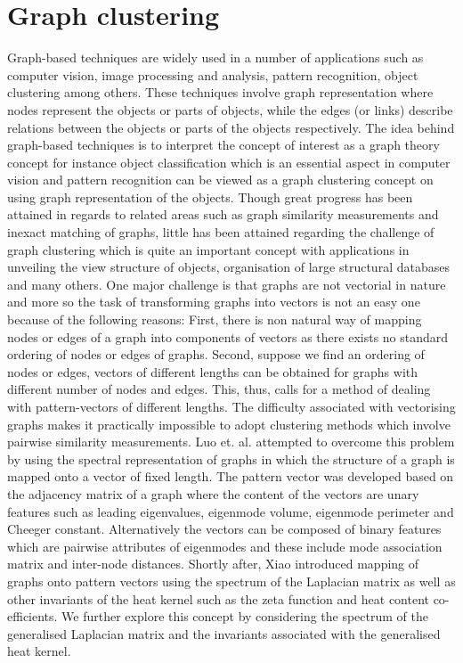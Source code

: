 \documentclass[10pt,a4paper]{article}
\theoremstyle{plain}
\theoremstyle{definition}
\begin{document}
\section{Graph clustering}
Graph-based techniques are widely used in a number of applications such as computer vision,  image processing and analysis, pattern recognition, object clustering among others. These techniques involve graph representation where nodes represent the objects or parts of objects, while the edges (or links) describe relations between the objects or parts of the objects respectively. The idea behind graph-based techniques is to interpret the concept of interest as a graph theory concept for instance object classification which is an essential aspect in computer vision and pattern recognition can be viewed as a graph clustering concept on using graph representation of the objects. Though great progress has been attained in regards to related areas such as graph similarity measurements and inexact matching of graphs, little has been attained regarding the challenge of graph clustering which is quite an important concept with applications in unveiling the view structure of objects, organisation of large structural databases and many others. One major challenge is that graphs are not vectorial in nature and more so the task of transforming graphs into vectors is not an easy one because of the following reasons: First, there is non natural way of mapping nodes or edges of a graph into components of vectors as there exists no standard ordering of nodes or edges of graphs. Second, suppose we find an ordering of nodes or edges, vectors of different lengths can be obtained for graphs with different number of nodes and edges. This, thus,  calls for a method of dealing with pattern-vectors of different lengths. The difficulty associated with vectorising graphs makes it practically impossible to adopt clustering methods which involve pairwise similarity measurements. Luo et. al. \citep{luo2003spectral} attempted to overcome this problem by using the spectral representation of graphs in which the structure of a graph is mapped onto a vector of fixed length. The pattern vector was developed based on the adjacency matrix of a graph where the content of the vectors are unary features such as leading eigenvalues, eigenmode volume, eigenmode perimeter and Cheeger constant. Alternatively the vectors can be composed of binary features which are pairwise attributes of eigenmodes and these include mode association matrix and inter-node distances. Shortly after, Xiao \citep{xiao2009graph} introduced mapping of graphs onto pattern vectors using the spectrum of the Laplacian matrix as well as other invariants of the heat kernel such as the zeta function and heat content co-efficients. We further explore this concept by considering the spectrum of the generalised Laplacian matrix and the invariants associated with the generalised heat kernel.
\end{document}
